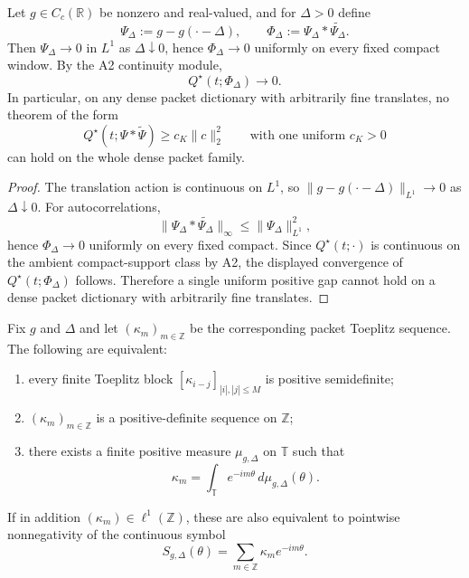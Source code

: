 \begin{proposition}\label{prop:a3-pd-too-strong}
Let $g\in C_c(\mathbb R)$ be nonzero and real-valued, and for $\Delta>0$ define
\[
  \Psi_\Delta:=g-g(\cdot-\Delta),
  \qquad
  \Phi_\Delta:=\Psi_\Delta * \widetilde{\Psi_\Delta}.
\]
Then $\Psi_\Delta\to0$ in $L^1$ as $\Delta\downarrow0$, hence
$\Phi_\Delta\to0$ uniformly on every fixed compact window. By the A2 continuity
module,
\[
  Q^\star(t;\Phi_\Delta)\to0.
\]
In particular, on any dense packet dictionary with arbitrarily fine translates,
no theorem of the form
\[
  Q^\star(t;\Psi * \widetilde{\Psi})\ge c_K\|c\|_2^2
  \qquad\text{with one uniform }c_K>0
\]
can hold on the whole dense packet family.
\end{proposition}

\begin{proof}
The translation action is continuous on $L^1$, so
$\|g-g(\cdot-\Delta)\|_{L^1}\to0$ as $\Delta\downarrow0$. For autocorrelations,
\[
  \|\Psi_\Delta * \widetilde{\Psi_\Delta}\|_\infty
  \le \|\Psi_\Delta\|_{L^1}^2,
\]
hence $\Phi_\Delta\to0$ uniformly on every fixed compact. Since
$Q^\star(t;\cdot)$ is continuous on the ambient compact-support class by A2,
the displayed convergence of $Q^\star(t;\Phi_\Delta)$ follows. Therefore a
single uniform positive gap cannot hold on a dense packet dictionary with
arbitrarily fine translates.
\end{proof}

\begin{proposition}\label{prop:packet-herglotz}
Fix $g$ and $\Delta$ and let $(\kappa_m)_{m\in\mathbb Z}$ be the corresponding
packet Toeplitz sequence. The following are equivalent:
\begin{enumerate}
  \item every finite Toeplitz block $[\kappa_{i-j}]_{|i|,|j|\le M}$ is positive semidefinite;
  \item $(\kappa_m)_{m\in\mathbb Z}$ is a positive-definite sequence on $\mathbb Z$;
  \item there exists a finite positive measure $\mu_{g,\Delta}$ on $\mathbb T$
  such that
  \[
    \kappa_m=\int_{\mathbb T} e^{-im\theta}\,d\mu_{g,\Delta}(\theta).
  \]
\end{enumerate}
If in addition $(\kappa_m)\in\ell^1(\mathbb Z)$, these are also equivalent to
pointwise nonnegativity of the continuous symbol
\[
  S_{g,\Delta}(\theta)=\sum_{m\in\mathbb Z}\kappa_m e^{-im\theta}.
\]
\end{proposition}

